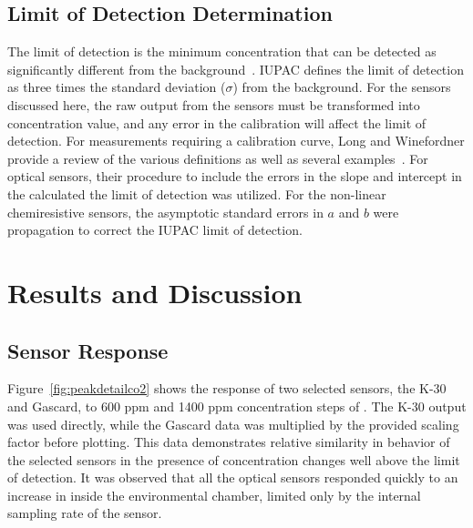 \documentclass[sensors,article,submit,moreauthors,pdftex]{Definitions/mdpi}
\begin{document}
		\subsection{Limit of Detection Determination}
			\label{sec:method_detection}
			The limit of detection is the minimum concentration that can be detected as significantly different from the background~\cite{long_limit_1983,currie_detection:_1997,mocak_j._statistical_2009}.
			IUPAC defines the limit of detection as three times the standard deviation ($\sigma$) from the background.
			For the sensors discussed here, the raw output from the sensors must be transformed into concentration value, and any error in the calibration will affect the limit of detection.
			For measurements requiring a calibration curve, Long and Winefordner provide a review of the various definitions as well as several examples~\cite{long_limit_1983}.
			For optical sensors, their procedure to include the errors in the slope and intercept in the calculated the limit of detection was utilized.
			For the non-linear chemiresistive sensors, the asymptotic standard errors in $a$ and $b$ were propagation to correct the IUPAC limit of detection.
			
	
	\section{Results and Discussion}
	
		\subsection{Sensor Response}
		\label{sec:time}
	
			Figure~\ref{fig:peakdetailco2} shows the response of two selected  sensors, the K-30 and Gascard, to 600 ppm and 1400 ppm concentration steps of .
			The K-30 output was used directly, while the Gascard data was multiplied by the provided scaling factor before plotting.
			This data demonstrates relative similarity in behavior of the selected sensors in the presence of concentration changes well above the limit of detection.
			It was observed that all the optical sensors responded quickly to an increase in  inside the environmental chamber, limited only by the internal sampling rate of the sensor.
			
\end{document}

